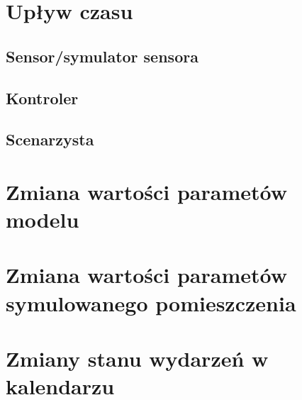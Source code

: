 \section{Upływ czasu}
\subsection{Sensor/symulator sensora}
\subsection{Kontroler}
\subsection{Scenarzysta}

\section{Zmiana wartości parametów modelu}
\section{Zmiana wartości parametów symulowanego pomieszczenia}

\section{Zmiany stanu wydarzeń w kalendarzu}

